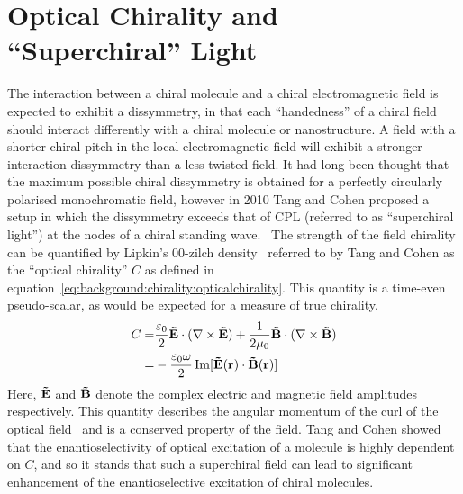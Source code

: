 \section{Optical Chirality and ``Superchiral'' Light}\label{sec:background:Chirality:opticalchirality}
The interaction between a chiral molecule and a chiral electromagnetic field is expected to exhibit a dissymmetry, in that each ``handedness'' of a chiral field should interact differently with a chiral molecule or nanostructure. A field with a shorter chiral pitch in the local electromagnetic field will exhibit a stronger interaction dissymmetry than a less twisted field. It had long been thought that the maximum possible chiral dissymmetry is obtained for a perfectly circularly polarised monochromatic field, however in 2010 Tang and Cohen proposed a setup in which the dissymmetry exceeds that of CPL (referred to as ``superchiral light'') at the nodes of a chiral standing wave.~\cite{Tang2010}
The strength of the field chirality can be quantified by Lipkin's 00-zilch density~\cite{Lipkin1964} referred to by Tang and Cohen as the ``optical chirality'' $C$ as defined in equation~\ref{eq:background:chirality:opticalchirality}. This quantity is a time-even pseudo-scalar, as would be expected for a measure of true chirality.
\begin{equation} \label{eq:background:chirality:opticalchirality}
    \begin{split}
        C = &\frac{\varepsilon_0 }{2}{\bf{\tilde E}} \cdot (\nabla  \times {\bf{\tilde E}}) + \frac{1}{{2\mu _0}}{\bf{\tilde B}} \cdot (\nabla  \times {\bf{\tilde B}}) \\
        = &- \frac{{{\varepsilon _0}\omega }}{2} \operatorname{Im}[ \bf{\tilde E}(\bf{r}) \cdot \bf{\tilde B}(\bf{r}) ]
    \end{split}
\end{equation}
Here, $\bf{\tilde E}$ and $\bf{\tilde B}$ denote the complex electric and magnetic field amplitudes respectively. This quantity describes the angular momentum of the curl of the optical field~\cite{Cameron2012a} and is a conserved property of the field. Tang and Cohen showed that the enantioselectivity of optical excitation of a molecule is highly dependent on $C$, and so it stands that such a superchiral field can lead to significant enhancement of the enantioselective excitation of chiral molecules.


